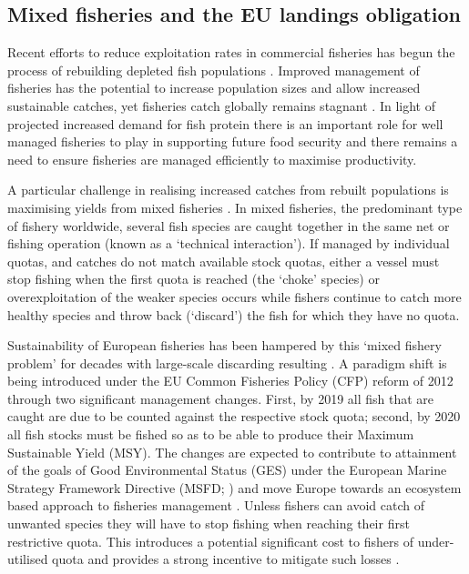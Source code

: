 \documentclass{nature}
\begin{document}
\begin{linenumbers}
\subsection{Mixed fisheries and the EU landings obligation} 

Recent efforts to reduce exploitation rates in commercial fisheries has begun
the process of rebuilding depleted fish populations \cite{Worm2009}.  Improved
management of fisheries has the potential to increase population sizes and
allow increased sustainable catches, yet fisheries catch globally remains
stagnant \cite{FAO2016}. In light of projected increased demand for fish
protein \cite{B??n??2016} there is an important role for well managed fisheries
to play in supporting future food security \cite{Mcclanahan2015} and there
remains a need to ensure fisheries are managed efficiently to maximise
productivity.

A particular challenge in realising increased catches from rebuilt populations
is maximising yields from mixed fisheries \cite{Branch2008, Kuriyama2016,
	Ulrich2016}. In mixed fisheries, the predominant type
of fishery worldwide, several fish species are caught together in the same net
or fishing operation (known as a `technical interaction'). If managed by
individual quotas, and catches do not match available stock quotas, either a
vessel must stop fishing when the first quota is reached (the `choke' species)
or overexploitation of the weaker species occurs while fishers continue to
catch more healthy species and throw back (`discard') the fish for which they
have no quota.

Sustainability of European fisheries has been hampered by this `mixed fishery
problem' for decades with large-scale discarding resulting \cite{Borges2015,
	Uhlmann2014}.  A paradigm shift is being introduced under the EU Common
Fisheries Policy (CFP) reform of 2012 through two significant management
changes.  First, by 2019 all fish that are caught are due to be counted against
the respective stock quota; second, by 2020 all fish stocks must be fished so
as to be able to produce their Maximum Sustainable Yield
(MSY)\cite{EuropeanParliamentandCounciloftheEuropeanUnion2013}. The changes are
expected to contribute to attainment of the goals of Good Environmental Status
(GES) under the European Marine Strategy Framework Directive (MSFD;
\cite{EuropeanParliament2008}) and move Europe towards an ecosystem based
approach to fisheries management \cite{Garcia2003}. Unless fishers can avoid
catch of unwanted species they will have to stop fishing when reaching their
first restrictive quota. This introduces a potential significant cost to
fishers of under-utilised quota\cite{Hoff2010a, Ulrich2016} and provides a
strong incentive to mitigate such losses \cite{Condie2013, Condie2013a}. 


\end{linenumbers}
\end{document}
